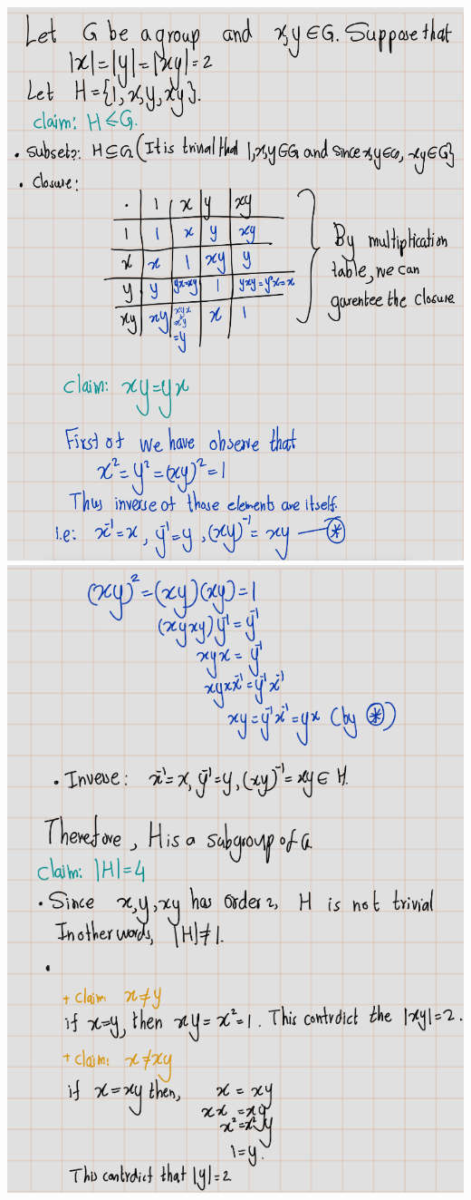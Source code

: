 \documentclass[
]{book}
\theoremstyle{definition}
\theoremstyle{definition}
\theoremstyle{definition}
\theoremstyle{definition}
\theoremstyle{remark}
\begin{document}
\includegraphics{figures/ch_2/fig64.png}
\includegraphics{figures/ch_2/fig65.png}
\end{document}
